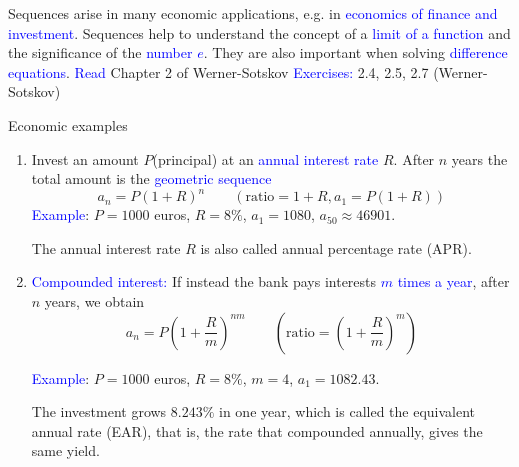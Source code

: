 \documentclass[11pt,aspectratio=169]{beamer}
\begin{document}
\begin{frame}{}
%
Sequences arise in many economic applications, e.g. in \textcolor{blue}{economics of finance and investment}.
\vskip 12pt
Sequences help to understand the concept of a \textcolor{blue}{limit of a function} and the significance of the \textcolor{blue}{number $e$}. 
\vskip 12pt
 They are also important when solving \textcolor{blue}{difference equations}.
\vskip 12pt
\textcolor{blue}{Read} Chapter 2 of Werner-Sotskov 
\vskip 12pt
 \textcolor{blue}{Exercises:} 2.4, 2.5, 2.7 (Werner-Sotskov)
%
\end{frame}



\begin{frame}{Economic examples  }

\begin{enumerate}
\item {Invest} an amount $P$(principal) at an \textcolor{blue}{annual interest rate} $R$. After $n$ years the total amount is the \textcolor{blue}{geometric sequence}
$$a_n=P(1+R)^n\qquad (\text{ratio}=1+R, a_1=P(1+R))$$
\textcolor{blue}{Example}: $P=1000$ euros, $R=8\%$, $a_1=1080$, $a_{50}\approx 46901$.

The annual interest rate $R$ is also called \alert{annual percentage rate} (APR).

%

\item \textcolor{blue}{Compounded interest:} If instead the bank pays interests \textcolor{blue}{$m$ times a year}, after $n$ years, we obtain
$$
a_n=P\left(1+\frac{R}{m}\right)^{n m}\qquad (\text{ratio}=(1+\frac{R}{m})^{m})
$$

\textcolor{blue}{Example}: $P=1000$ euros, $R=8\%$, $m=4$, $a_1=1082.43$. 

The investment grows $8.243 \%$ in one year, which is called the \alert{equivalent annual rate} (EAR), that is, the rate that compounded annually, gives the same yield.

\end{enumerate}\end{frame}
\end{document}
